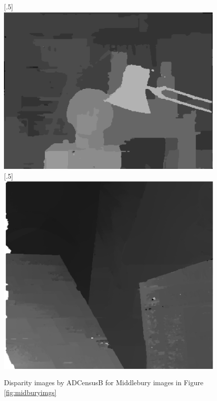 \begin{figure}[H]
\centering
{}
[.5\linewidth]{\includegraphics[scale=0.5]{tsukubadisp}}%
[.5\linewidth]{\includegraphics[scale=0.51]{venusdisp}}%
\caption{Disparity images by ADCensusB for Middlebury images in Figure \protect\ref{fig:midburyimgs}}
\label{fig:midburydisps}
\end{figure}

